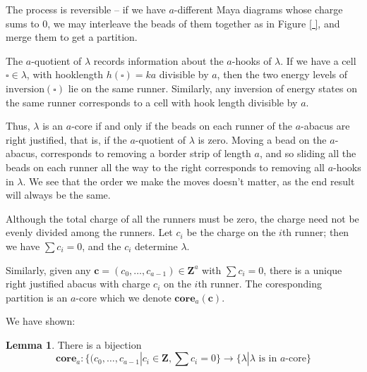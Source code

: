 \documentclass{amsart}[12pt]
\theoremstyle{definition}
\newtheorem{lemma}[dummy]{Lemma}
\newcommand{\Z}{\mathbf{Z}}
\newcommand{\core}{\mathbf{core}}
\begin{document}
The process is reversible -- if we have $a$-different Maya diagrams whose charge sums to $0$, we may interleave the beads of them together as in Figure \ref{ }, and merge them to get a partition.  


The $a$-quotient of $\lambda$ records information about the $a$-hooks of $\lambda$.  If we have a cell $\square\in\lambda$,  with hooklength $h(\square)=ka$ divisible by $a$, then the two energy levels of $\textrm{inversion}(\square)$ lie on the same runner.  Similarly, any inversion of energy states on the same runner corresponds to a cell with hook length divisible by $a$.  

Thus, $\lambda$ is an $a$-core if and only if the beads on each runner of the $a$-abacus are right justified, that is, if the $a$-quotient of $\lambda$ is zero.  Moving a bead on the $a$-abacus, corresponds to removing a border strip of length $a$, and so sliding all the beads on each runner all the way to the right corresponds to removing all $a$-hooks in $\lambda$.  We see that the order we make the moves doesn't matter, as the end result will always be the same.

  Although the total charge of all the runners must be zero, the charge need not be evenly divided among the runners.  Let
$c_i$ be the charge on the $i$th runner; then we have $\sum c_i=0$, and the $c_i$ determine $\lambda$.

Similarly, given any $\mathbf{c}=(c_0,\dots,c_{a-1})\in\Z^a$ with $\sum c_i=0$, there is a unique right justified abacus with charge  $c_i$ on the $i$th runner.  The coresponding partition is an $a$-core which we denote $\core_a(\mathbf{c})$.

We have shown:

\begin{lemma}
There is a bijection $$\core_a:\{(c_0,\dots,c_{a-1}|c_i\in\Z, \sum c_i=0\}\to \{\lambda | \lambda \text{ is in $a$-core} \}$$
\end{lemma}
\end{document}
